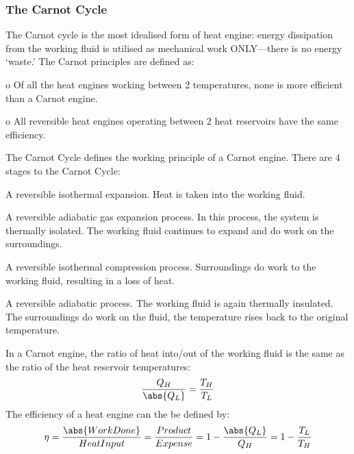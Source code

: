 \documentclass{physics-notes}
\begin{document}
\subsubsection{The Carnot Cycle}
The Carnot cycle is the most idealised form of heat engine: energy dissipation from the working fluid is utilised as mechanical work ONLY—there is no energy ‘waste.’ The Carnot principles are defined as:
\begin{description}[font=$\bullet$~\normalfont\scshape]
	\item o	Of all the heat engines working between 2 temperatures, none is more efficient than a Carnot engine.
	\item o	All reversible heat engines operating between 2 heat reservoirs have the same efficiency.
\end{description}
The Carnot Cycle defines the working principle of a Carnot engine. There are 4 stages to the Carnot Cycle:
\begin{description}[font=$\bullet$~\normalfont\scshape]
	\item [i.]	A reversible isothermal expansion. Heat is taken into the working fluid.
	\item [ii.] A reversible adiabatic gas expansion process. In this process, the system is thermally isolated. The working fluid continues to expand and do work on the surroundings.
	\item [iii.] A reversible isothermal compression process. Surroundings do work to the working fluid, resulting in a loss of heat.
	\item [iv.] A reversible adiabatic process. The working fluid is again thermally insulated. The surroundings do work on the fluid, the temperature rises back to the original temperature. 
\end{description}
In a Carnot engine, the ratio of heat into/out of the working fluid is the same as the ratio of the heat reservoir temperatures:
\begin{equation}
\frac{Q_H}{\abs{Q_L}} = \frac{T_H}{T_L}
\end{equation}
The efficiency of a heat engine can the be defined by:
\begin{equation}
\eta = \frac{\abs{Work Done}}{Heat Input} = \frac{Product}{Expense} = 1 - \frac{\abs{Q_L}}{Q_H} = 1 - \frac{T_L}{T_H}
\end{equation}
\end{document}
